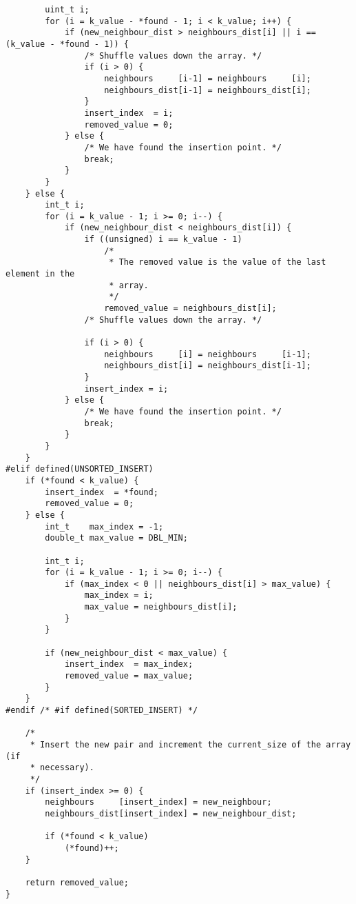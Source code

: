 \begin{lstlisting}
        uint_t i;
        for (i = k_value - *found - 1; i < k_value; i++) {
            if (new_neighbour_dist > neighbours_dist[i] || i == (k_value - *found - 1)) {
                /* Shuffle values down the array. */
                if (i > 0) {
                    neighbours     [i-1] = neighbours     [i];
                    neighbours_dist[i-1] = neighbours_dist[i];
                }
                insert_index  = i;
                removed_value = 0;
            } else {
                /* We have found the insertion point. */
                break;
            }
        }
    } else {
        int_t i;
        for (i = k_value - 1; i >= 0; i--) {
            if (new_neighbour_dist < neighbours_dist[i]) {
                if ((unsigned) i == k_value - 1)
                    /*
                     * The removed value is the value of the last element in the
                     * array.
                     */
                    removed_value = neighbours_dist[i];
                /* Shuffle values down the array. */
                
                if (i > 0) {
                    neighbours     [i] = neighbours     [i-1];
                    neighbours_dist[i] = neighbours_dist[i-1];
                }
                insert_index = i;
            } else {
                /* We have found the insertion point. */
                break;
            }
        }
    }
#elif defined(UNSORTED_INSERT)
    if (*found < k_value) {
        insert_index  = *found;
        removed_value = 0;
    } else {
        int_t    max_index = -1;
        double_t max_value = DBL_MIN;
        
        int_t i;
        for (i = k_value - 1; i >= 0; i--) {
            if (max_index < 0 || neighbours_dist[i] > max_value) {
                max_index = i;
                max_value = neighbours_dist[i];
            }
        }
        
        if (new_neighbour_dist < max_value) {
            insert_index  = max_index;
            removed_value = max_value;
        }
    }
#endif /* #if defined(SORTED_INSERT) */
    
    /*
     * Insert the new pair and increment the current_size of the array (if
     * necessary).
     */
    if (insert_index >= 0) {
        neighbours     [insert_index] = new_neighbour;
        neighbours_dist[insert_index] = new_neighbour_dist;
        
        if (*found < k_value)
            (*found)++;
    }
    
    return removed_value;
}


\end{lstlisting}
